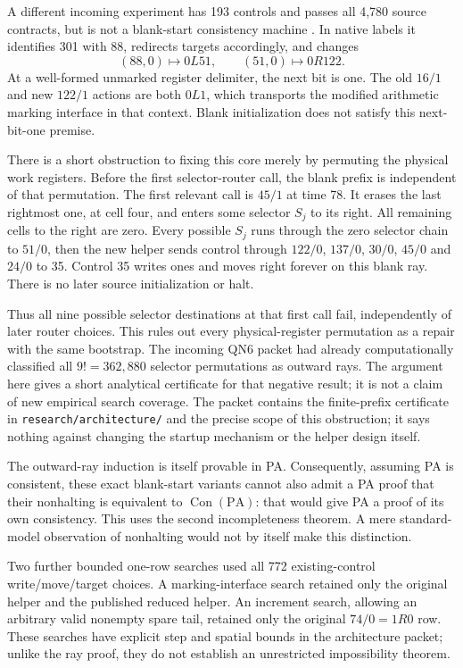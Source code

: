 \documentclass[11pt,letterpaper]{article}
\newcommand{\PA}{\mathrm{PA}}
\newcommand{\Con}{\operatorname{Con}}
\newcommand{\file}[1]{\texttt{\nolinkurl{#1}}}
\begin{document}
A different incoming experiment has 193 controls and passes all
4,780 source contracts, but is not a blank-start consistency
machine \cite{runtime193}. In native labels it identifies 301
with 88, redirects targets accordingly, and changes
\[
            (88,0)\mapsto0L51,\qquad
            (51,0)\mapsto0R122.
\]
At a well-formed unmarked register delimiter, the next bit is one.
The old $16/1$ and new $122/1$ actions are both $0L1$, which
transports the modified arithmetic marking interface in that
context. Blank initialization does not satisfy this next-bit-one
premise.

There is a short obstruction to fixing this core merely by
permuting the physical work registers. Before the first
selector-router call, the blank prefix is independent of that
permutation. The first relevant call is $45/1$ at time 78.
It erases the last rightmost one, at cell four, and enters
some selector $S_j$ to its right. All remaining cells to the
right are zero. Every possible $S_j$ runs through the zero
selector chain to $51/0$, then the new helper sends control
through $122/0$, $137/0$, $30/0$, $45/0$ and $24/0$ to 35.
Control 35 writes ones and moves right forever on this blank
ray. There is no later source initialization or halt.

Thus all nine possible selector destinations at that first call
fail, independently of later router choices. This rules out
every physical-register permutation as a repair with the same
bootstrap. The incoming QN6 packet had already computationally classified all
$9! = 362{,}880$ selector permutations as outward rays. The argument
here gives a short analytical certificate for that negative result;
it is not a claim of new empirical search coverage. The packet contains the finite-prefix
certificate in \file{research/architecture/} and the precise scope of this obstruction; it says
nothing against changing the startup mechanism or the helper
design itself.

The outward-ray induction is itself provable in PA. Consequently,
assuming PA is consistent, these exact blank-start variants cannot
also admit a PA proof that their nonhalting is equivalent to
$\Con(\PA)$: that would give PA a proof of its own consistency.
This uses the second incompleteness theorem. A mere standard-model
observation of nonhalting would not by itself make this distinction.

Two further bounded one-row searches used all 772 existing-control
write/move/target choices. A marking-interface search retained only
the original helper and the published reduced helper. An increment
search, allowing an arbitrary valid nonempty spare tail, retained only
the original $74/0=1R0$ row. These searches have explicit step and
spatial bounds in the architecture packet; unlike the ray proof,
they do not establish an unrestricted impossibility theorem.
\end{document}
